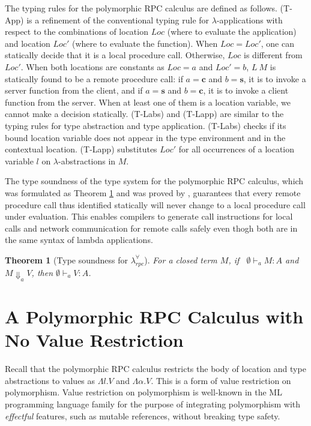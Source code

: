 \documentclass[a4paper]{article}
\theoremstyle{plain}
\newtheorem{theorem}{Theorem}
\theoremstyle{definition}
\newcommand{\polyrpc}{$\lambda_{rpc}^{\forall}$\xspace}
\newcommand{\client}{\textbf{c}}
\newcommand{\server}{\textbf{s}}
\newcommand{\evalRPC}[3]{#1\Downarrow_{#2}#3}
\newcommand{\typing}[4]{#1\vdash_{#2} #3 : #4}
\newcommand{\Loc}{Loc}
\begin{document}
The typing rules for the polymorphic RPC calculus are defined as
follows.
%
(T-App) is a refinement of the conventional typing rule for
$\lambda$-applications with respect to the combinations of location
$\Loc$ (where to evaluate the application) and location $\Loc'$ (where
to evaluate the function).
%
When $\Loc=\Loc'$, one can statically decide that it is a local
procedure call.
%
Otherwise, $\Loc$ is different from $\Loc'$.
%
When both locations are constants as $\Loc=a$ and $\Loc'=b$, $L \ M$
is statically found to be a remote procedure call: if $a=\client$ and
$b=\server$, it is to invoke a server function from the client, and if
$a=\server$ and $b=\client$, it is to invoke a client function from
the server.
%
When at least one of them is a location variable, we cannot make a
decision statically.
%
(T-Labs) and (T-Lapp) are similar to the typing rules for type
abstraction and type application.
%
(T-Labs) checks if its bound location variable does not appear in the
type environment and in the contextual location.
%
(T-Lapp) substitutes $\Loc'$ for all occurrences of a location
variable $l$ on $\lambda$-abstractions in $M$.

The type soundness of the type system for the polymorphic RPC
calculus, which was formulated as Theorem \ref{thm:typesoundness} and
was proved by \cite{CHOI:scp2020}, guarantees that every remote
procedure call thus identified statically will never change to a local
procedure call under evaluation.
%
This enables compilers to generate call instructions for local calls
and network communication for remote calls safely even thogh both are
in the same syntax of lambda applications.

\begin{theorem}[Type soundness for \polyrpc \cite{CHOI:scp2020}]
For a closed term $M$, if \ $\typing{\emptyset}{a}{M}{A}$ and
$\evalRPC{M}{a}{V}$, then $\typing{\emptyset}{a}{V}{A}$.
\label{thm:typesoundness}
\end{theorem}

\section{A Polymorphic RPC Calculus with No Value Restriction}
\label{app:2}

Recall that the polymorphic RPC calculus restricts the body of
location and type abstractions to values as $\Lambda l. V$ and
$\Lambda\alpha.V$.
%
This is a form of value restriction on polymorphism.
%
Value restriction on polymorphism is well-known in the ML programming
language family for the purpose of integrating polymorphism with {\it
  effectful} features, such as mutable references, without breaking
type safety.
\end{document}
